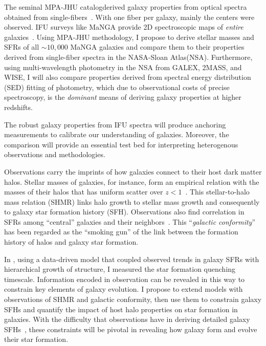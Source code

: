 The seminal MPA-JHU catalog\footnotemark[2] derived galaxy properties from optical spectra obtained from single-fibers~\citep{mpajhu_mass, mpajhu_sfr}. 
With one fiber per galaxy, mainly the centers were observed. 
IFU surveys like MaNGA provide 2D spectroscopic maps of {\em entire} galaxies~\citep{manga}. 
Using MPA-JHU methodology, I propose to derive stellar masses and SFRs of all {\rm ${\sim}10,000$} MaNGA galaxies and compare them to their properties derived from single-fiber spectra in the NASA-Sloan Atlas\footnotemark[3] (NSA). 
Furthermore, using multi-wavelength photometry in the NSA from GALEX, 2MASS, and WISE, I will also compare properties derived from spectral energy distribution (SED) fitting of photometry, 
which due to observational costs of precise spectroscopy, is the {\em dominant} means of deriving galaxy properties at higher redshifts. 

The robust galaxy properties from IFU spectra will produce anchoring measurements to calibrate our understanding of galaxies. 
Moreover, the comparison will provide an essential test bed for interpreting heterogenous observations and methodologies.

Observations carry the imprints of how galaxies connect to their host dark matter halos. 
Stellar masses of galaxies, for instance, form an empirical relation with the masses of their halos that has uniform scatter over $z< 1$~\citep[\emph{e.g.}][]{smhmr}. 
This stellar-to-halo mass relation (SHMR) links halo growth to stellar mass growth and consequently to galaxy star formation history (SFH). 
Observations also find correlation in SFRs among ``central'' galaxies and their neighbors~\citep{kauff_conform}.
This ``\emph{galactic conformity}'' has been regarded as the ``smoking gun'' of the link between the formation history of halos and galaxy star formation.%

In \cite{cenque}, using a data-driven model that coupled observed trends in galaxy SFRs with hierarchical growth of structure, I measured the star formation quenching timescale. 
Information encoded in observation can be revealed in this way to constrain key elements of galaxy evolution.
I propose to extend {\rm \cite{cenque}} models with observations of SHMR and galactic conformity, then use them to constrain galaxy SFHs and quantify the impact of host halo properties on star formation in galaxies. 
With the difficulty that observations have in deriving detailed galaxy SFHs~\citep[\emph{e.g.}][]{dressler}, these constraints will be pivotal in revealing how galaxy form and evolve their star formation. 

